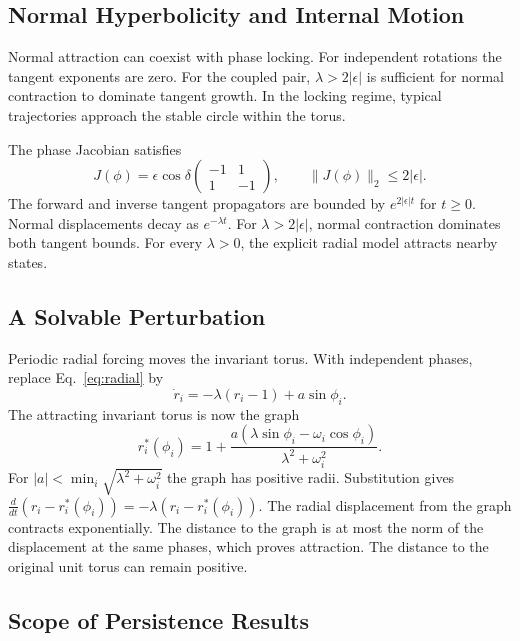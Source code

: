 \documentclass[12pt,a4paper]{article}
\begin{document}
\subsection{Normal Hyperbolicity and Internal Motion}

Normal attraction can coexist with phase locking. For independent rotations the tangent exponents are zero. For the coupled pair, $\lambda>2|\epsilon|$ is sufficient for normal contraction to dominate tangent growth. In the locking regime, typical trajectories approach the stable circle within the torus.

The phase Jacobian satisfies
\begin{equation}
 J(\phi)=\epsilon\cos\delta
 \begin{pmatrix}-1&1\\1&-1\end{pmatrix},\qquad
 \|J(\phi)\|_2\leq2|\epsilon|.
\end{equation}
The forward and inverse tangent propagators are bounded by $e^{2|\epsilon|t}$ for $t\geq0$. Normal displacements decay as $e^{-\lambda t}$. For $\lambda>2|\epsilon|$, normal contraction dominates both tangent bounds. For every $\lambda>0$, the explicit radial model attracts nearby states.

\subsection{A Solvable Perturbation}

Periodic radial forcing moves the invariant torus. With independent phases, replace Eq.~\eqref{eq:radial} by
\begin{equation}
 \dot r_i=-\lambda(r_i-1)+a\sin\phi_i.
\end{equation}
The attracting invariant torus is now the graph
\begin{equation}\label{eq:forced_graph}
 r_i^*(\phi_i)=1+\frac{a(\lambda\sin\phi_i-\omega_i\cos\phi_i)}{\lambda^2+\omega_i^2}.
\end{equation}
For $|a|<\min_i\sqrt{\lambda^2+\omega_i^2}$ the graph has positive radii. Substitution gives
$\frac{d}{dt}(r_i-r_i^*(\phi_i))=-\lambda(r_i-r_i^*(\phi_i))$.
The radial displacement from the graph contracts exponentially. The distance to the graph is at most the norm of the displacement at the same phases, which proves attraction. The distance to the original unit torus can remain positive.

\subsection{Scope of Persistence Results}
\end{document}
